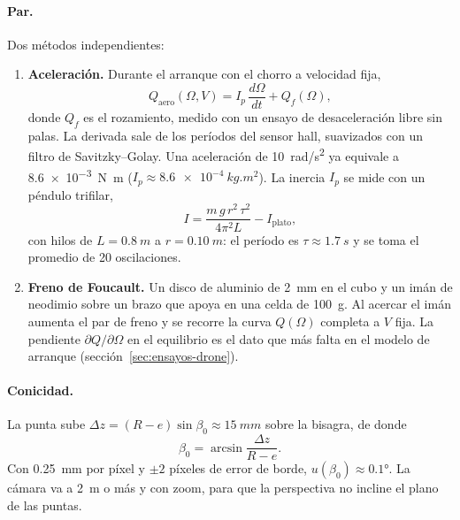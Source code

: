 \paragraph{Par.} Dos métodos independientes:
\begin{enumerate}
  \item \textbf{Aceleración.} Durante el arranque con el chorro a velocidad fija,
  \begin{equation}
    Q_\text{aero}(\Omega,V) = I_p\,\frac{d\Omega}{dt} + Q_f(\Omega),
    \label{eq:ensayos-Qacel}
  \end{equation}
  donde $Q_f$ es el rozamiento, medido con un ensayo de desaceleración libre sin palas. La
  derivada sale de los períodos del sensor hall, suavizados con un filtro de
  Savitzky--Golay. Una aceleración de \SI{10}{rad/s^2} ya equivale a \SI{8.6e-3}{N.m} ($I_p\approx\SI{8.6e-4}{kg.m^2}$).
  La inercia $I_p$ se mide con un péndulo trifilar,
  \begin{equation}
    I = \frac{m\,g\,r^2\,\tau^2}{4\pi^2 L} - I_\text{plato},
    \label{eq:ensayos-trifilar}
  \end{equation}
  con hilos de $L=\SI{0.8}{m}$ a $r=\SI{0.10}{m}$: el período es $\tau\approx\SI{1.7}{s}$ y
  se toma el promedio de 20 oscilaciones.
  \item \textbf{Freno de Foucault.} Un disco de aluminio de \SI{2}{mm} en el cubo y un imán
  de neodimio sobre un brazo que apoya en una celda de \SI{100}{g}. Al acercar el imán
  aumenta el par de freno y se recorre la curva $Q(\Omega)$ completa a $V$ fija. La
  pendiente $\partial Q/\partial\Omega$ en el equilibrio es el dato que más falta en el
  modelo de arranque (sección~\ref{sec:ensayos-drone}).
\end{enumerate}

\paragraph{Conicidad.} La punta sube $\Delta z=(R-e)\sin\beta_0\approx\SI{15}{mm}$ sobre la
bisagra, de donde
\begin{equation}
  \beta_0 = \arcsin\frac{\Delta z}{R-e}.
  \label{eq:ensayos-beta}
\end{equation}
Con \SI{0.25}{mm} por píxel y $\pm2$ píxeles de error de borde,
$u(\beta_0)\approx\ang{0.1}$. La cámara va a \SI{2}{m} o más y con zoom, para que la
perspectiva no incline el plano de las puntas.

